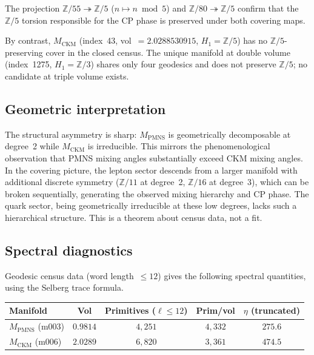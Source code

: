 ﻿\documentclass[12pt]{article}
\theoremstyle{definition}
\begin{document}
The projection $\mathbb{Z}/55\twoheadrightarrow\mathbb{Z}/5$
($n\mapsto n\bmod 5$) and $\mathbb{Z}/80\twoheadrightarrow\mathbb{Z}/5$
confirm that the $\mathbb{Z}/5$ torsion responsible for the CP phase
is preserved under both covering maps.

By contrast, $M_\text{CKM}$ (index~43, vol~$=2.0288530915$,
$H_1=\mathbb{Z}/5$) has no $\mathbb{Z}/5$-preserving cover in the
closed census. The unique manifold at double volume (index~1275,
$H_1=\mathbb{Z}/3$) shares only four geodesics and does not preserve
$\mathbb{Z}/5$; no candidate at triple volume exists.

\subsection{Geometric interpretation}

The structural asymmetry is sharp: $M_\text{PMNS}$ is geometrically
decomposable at degree~2 while $M_\text{CKM}$ is irreducible.
This mirrors the phenomenological observation that PMNS mixing angles
substantially exceed CKM mixing angles.
In the covering picture, the lepton sector descends from a larger
manifold with additional discrete symmetry ($\mathbb{Z}/11$ at
degree~2, $\mathbb{Z}/16$ at degree~3), which can be broken
sequentially, generating the observed mixing hierarchy and CP phase.
The quark sector, being geometrically irreducible at these low degrees,
lacks such a hierarchical structure. This is a theorem about census
data, not a fit.

\subsection{Spectral diagnostics}
\label{subsec:spectral_covering}

Geodesic census data (word length~$\leq 12$) gives the following
spectral quantities, using the Selberg trace formula.

\begin{center}\small
\begin{tabular}{lcccc}
\toprule
Manifold & Vol & Primitives ($\ell\leq 12$) & Prim/vol & $\eta$ (truncated) \\
\midrule
$M_\text{PMNS}$ (m003) & $0.9814$ & $4{,}251$ & $4{,}332$ & $275.6$ \\
$M_\text{CKM}$  (m006) & $2.0289$ & $6{,}820$ & $3{,}361$ & $474.5$ \\
\bottomrule
\end{tabular}
\end{center}
\end{document}
